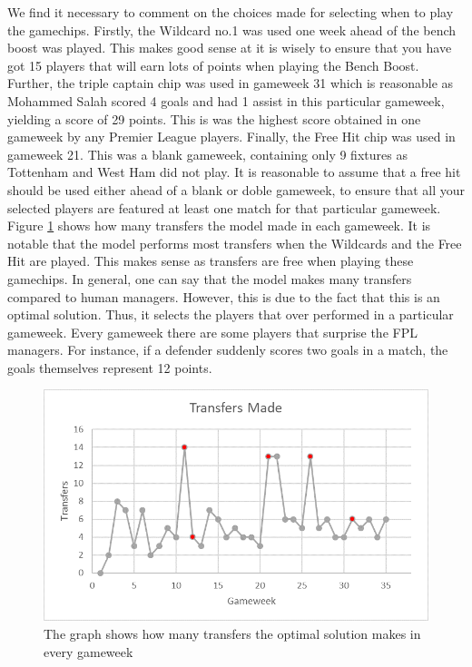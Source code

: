 We find it necessary to comment on the choices made for selecting when to play the gamechips. Firstly, the Wildcard no.1 was used one week ahead of the bench boost was played. This makes good sense at it is wisely to ensure that you have got 15 players that will earn lots of points when playing the Bench Boost. Further, the triple captain chip was used in gameweek 31 which is reasonable as Mohammed Salah scored 4 goals and had 1 assist in this particular gameweek, yielding a score of 29 points. This is was the highest score obtained in one gameweek by any Premier League players. Finally, the Free Hit chip was used in gameweek 21. This was a blank gameweek, containing only 9 fixtures as Tottenham and West Ham did not play. It is reasonable to assume that a free hit should be used either ahead of a blank or doble gameweek, to ensure that all your selected players are featured at least one match for that particular gameweek.
\newpar
Figure \ref{Figure_Transfers} shows how many transfers the model made in each gameweek. It is notable that the model performs most transfers when the Wildcards and the Free Hit are played. This makes sense as transfers are free when playing these gamechips. In general, one can say that the model makes many transfers compared to human managers. However, this is due to the fact that this is an optimal solution. Thus, it selects the players that over performed in a particular gameweek. Every gameweek there are some players that surprise the FPL managers. For instance, if a defender suddenly scores two goals in a match, the goals themselves represent 12 points. 

\begin{figure}[H]
\label{fig_Transfers}
    \centering
    \includegraphics[scale=1.00]{fig/chapter_7/Transfers.png}
    \caption{The graph shows how many transfers the optimal solution makes in every gameweek}
\label{Figure_Transfers}    
\end{figure}


